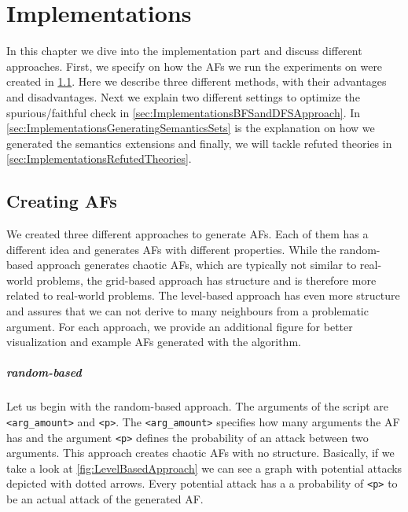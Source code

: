 \chapter{Implementations}
In this chapter we dive into the implementation part and discuss different approaches. First, we specify on how the AFs we run the experiments on were created in \cref{sec:ImplementationsCreatingAFs}. Here we describe three different methods, with their advantages and disadvantages. Next we explain two different settings to optimize the spurious/faithful check in \cref{sec:ImplementationsBFSandDFSApproach}. In \cref{sec:ImplementationsGeneratingSemanticsSets} is the explanation on how we generated the semantics extensions and finally, we will tackle refuted theories in \cref{sec:ImplementationsRefutedTheories}.

\section{Creating AFs}
\label{sec:ImplementationsCreatingAFs}
We created three different approaches to generate AFs. Each of them has a different idea and generates AFs with different properties. While the random-based approach generates chaotic AFs, which are typically not similar to real-world problems, the grid-based approach has structure and is therefore more related to real-world problems. The level-based approach has even more structure and assures that we can not derive to many neighbours from a problematic argument. For each approach, we provide an additional figure for better visualization and example AFs generated with the algorithm.

\paragraph{random-based} Let us begin with the random-based approach. The arguments of the script are \texttt{<arg\_amount>} and \texttt{<p>}. The \texttt{<arg\_amount>} specifies how many arguments the AF has and the argument \texttt{<p>} defines the probability of an attack between two arguments. This approach creates chaotic AFs with no structure. Basically, if we take a look at \cref{fig:LevelBasedApproach} we can see a graph with potential attacks depicted with dotted arrows. Every potential attack has a a probability of \texttt{<p>} to be an actual attack of the generated AF.


